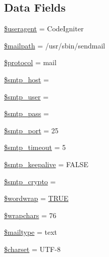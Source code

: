 \subsection*{Data Fields}
\begin{DoxyCompactItemize}
\item 
\mbox{\hyperlink{class_c_i___email_adc6d59b7c0768eeffafe3b78c4836959}{\$useragent}} = \textquotesingle{}Code\+Igniter\textquotesingle{}
\item 
\mbox{\hyperlink{class_c_i___email_a23dd98b1852b9e73c20292b2cc96b20f}{\$mailpath}} = \textquotesingle{}/usr/sbin/sendmail\textquotesingle{}
\item 
\mbox{\hyperlink{class_c_i___email_ac01bf1cf041487498864d054b991f570}{\$protocol}} = \textquotesingle{}mail\textquotesingle{}
\item 
\mbox{\hyperlink{class_c_i___email_aa1ef5144d9ef39807b72f29299128eb1}{\$smtp\+\_\+host}} = \textquotesingle{}\textquotesingle{}
\item 
\mbox{\hyperlink{class_c_i___email_ac77010332fb55af4ed3ac38f0e39114d}{\$smtp\+\_\+user}} = \textquotesingle{}\textquotesingle{}
\item 
\mbox{\hyperlink{class_c_i___email_ae8b7daa14d7182bd564f04f752948400}{\$smtp\+\_\+pass}} = \textquotesingle{}\textquotesingle{}
\item 
\mbox{\hyperlink{class_c_i___email_af98a134522a65f513cff2718fc74968f}{\$smtp\+\_\+port}} = 25
\item 
\mbox{\hyperlink{class_c_i___email_afd19e9cbfc82dd26a270fccd29e29728}{\$smtp\+\_\+timeout}} = 5
\item 
\mbox{\hyperlink{class_c_i___email_a3ea493da94ea80d0439937af4eab7621}{\$smtp\+\_\+keepalive}} = F\+A\+L\+SE
\item 
\mbox{\hyperlink{class_c_i___email_ab324ab40108bacab087e18556627ef1e}{\$smtp\+\_\+crypto}} = \textquotesingle{}\textquotesingle{}
\item 
\mbox{\hyperlink{class_c_i___email_abc150a71df67310da874f7399ab5f2cd}{\$wordwrap}} = \mbox{\hyperlink{constants_8php_ae04a3efe6aa42044f803ee90c2277846}{T\+R\+UE}}
\item 
\mbox{\hyperlink{class_c_i___email_a8834e27a87a8b935ab1155d1d7bd44d2}{\$wrapchars}} = 76
\item 
\mbox{\hyperlink{class_c_i___email_a7f4dd7af7642585306869f8985ab744f}{\$mailtype}} = \textquotesingle{}text\textquotesingle{}
\item 
\mbox{\hyperlink{class_c_i___email_af10158dd74b75f1d337e83102d6b82ce}{\$charset}} = \textquotesingle{}U\+TF-\/8\textquotesingle{}

\end{DoxyCompactItemize}
